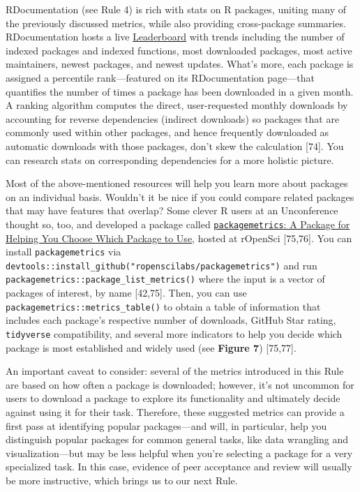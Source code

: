 \documentclass[10pt,letterpaper]{article}
\begin{document}
RDocumentation (see Rule 4) is rich with stats on R packages, uniting
many of the previously discussed metrics, while also providing
cross-package summaries. RDocumentation hosts a live
\href{https://www.rdocumentation.org/trends}{Leaderboard} with trends
including the number of indexed packages and indexed functions, most
downloaded packages, most active maintainers, newest packages, and
newest updates. What's more, each package is assigned a percentile
rank---featured on its RDocumentation page---that quantifies the number
of times a package has been downloaded in a given month. A ranking
algorithm computes the direct, user-requested monthly downloads by
accounting for reverse dependencies (indirect downloads) so packages
that are commonly used within other packages, and hence frequently
downloaded as automatic downloads with those packages, don't skew the
calculation {[}74{]}. You can research stats on corresponding
dependencies for a more holistic picture.

Most of the above-mentioned resources will help you learn more about
packages on an individual basis. Wouldn't it be nice if you could
compare related packages that may have features that overlap? Some
clever R users at an Unconference thought so, too, and developed a
package called
\href{https://docs.ropensci.org/packagemetrics/}{\texttt{packagemetrics}:
A Package for Helping You Choose Which Package to Use}, hosted at
rOpenSci {[}75,76{]}. You can install \texttt{packagemetrics} via
\texttt{devtools::install\_github("ropenscilabs/packagemetrics")} and
run \texttt{packagemetrics::package\_list\_metrics()} where the input is
a vector of packages of interest, by name {[}42,75{]}. Then, you can use
\texttt{packagemetrics::metrics\_table()} to obtain a table of
information that includes each package's respective number of downloads,
GitHub Star rating, \texttt{tidyverse} compatibility, and several more
indicators to help you decide which package is most established and
widely used (see \textbf{Figure 7}) {[}75,77{]}.

An important caveat to consider: several of the metrics introduced in
this Rule are based on how often a package is downloaded; however, it's
not uncommon for users to download a package to explore its
functionality and ultimately decide against using it for their task.
Therefore, these suggested metrics can provide a first pass at
identifying popular packages---and will, in particular, help you
distinguish popular packages for common general tasks, like data
wrangling and visualization---but may be less helpful when you're
selecting a package for a very specialized task. In this case, evidence
of peer acceptance and review will usually be more instructive, which
brings us to our next Rule.
\end{document}
